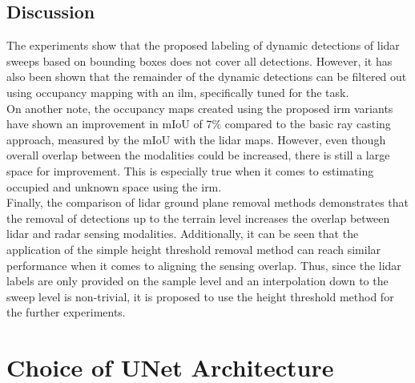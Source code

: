 \subsection{Discussion}
\label{subsec:discussion_gt}
The experiments show that the proposed labeling of dynamic detections of lidar sweeps based on bounding boxes does not cover all detections. However, it has also been shown that the remainder of the dynamic detections can be filtered out using occupancy mapping with an \gls{ilm}, specifically tuned for the task.
\\
On another note, the occupancy maps created using the proposed \gls{irm} variants have shown an improvement in mIoU of $7\%$ compared to the basic ray casting approach, measured by the mIoU with the lidar maps. However, even though overall overlap between the modalities could be increased, there is still a large space for improvement. This is especially true when it comes to estimating occupied and unknown space using the \gls{irm}. 
\\
Finally, the comparison of lidar ground plane removal methods demonstrates that the removal of detections up to the terrain level increases the overlap between lidar and radar sensing modalities. Additionally, it can be seen that the application of the simple height threshold removal method can reach similar performance when it comes to aligning the sensing overlap. Thus, since the lidar labels are only provided on the sample level and an interpolation down to the sweep level is non-trivial, it is proposed to use the height threshold method for the further experiments.
%
\section{Choice of UNet Architecture}
\label{sec:choice_of_unet_arch}
%
